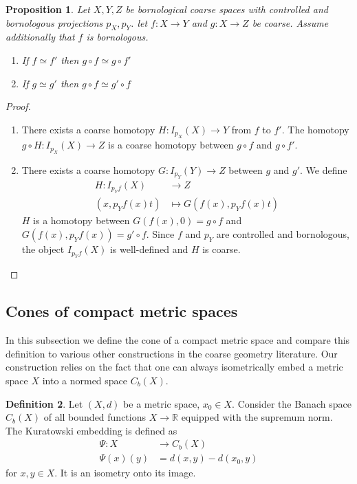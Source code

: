 \documentclass[a4paper,11pt]{article}
\theoremstyle{definition}
\newtheorem{definition}{Definition}[section]
\theoremstyle{plain}
\newtheorem{prop}[definition]{Proposition}
\theoremstyle{remark}
\begin{document}
\begin{prop} \label{properties} Let $X,Y,Z$ be bornological coarse spaces with controlled and bornologous projections $p_{X},p_{Y}$. let $f: X\rightarrow Y$ and $g: X\rightarrow Z$ be coarse. Assume additionally that $f$ is bornologous.
\begin{enumerate}
\item If $f\simeq f'$ then $g\circ f\simeq g\circ f'$
\item If $g\simeq g'$ then $g\circ f\simeq g'\circ f$
\end{enumerate}
\end{prop}

\begin{proof}
\begin{enumerate}
\item There exists a coarse homotopy $H: I_{p_{X}}(X)\rightarrow Y$ from $f$ to $f'$. The homotopy $g\circ H: I_{p_{X}}(X)\rightarrow Z$ is a coarse homotopy between $g\circ f$ and $g\circ f'$.
\item There exists a coarse homotopy $G: I_{p_{Y}}(Y)\rightarrow Z$ between $g$ and $g'$. We define
\begin{align*}
H: I_{p_{Y}f}(X)&\longrightarrow Z\\
(x,p_{Y}f(x)t) &\longmapsto G(f(x),p_{Y}f(x)t)
\end{align*}
$H$ is a homotopy between $G(f(x),0) = g\circ f$ and $G(f(x),p_{Y}f(x)) = g'\circ f$. Since $f$ and $p_{Y}$ are controlled and bornologous, the object $I_{p_{Y}f}(X)$ is well-defined and $H$ is coarse.
\end{enumerate}
\end{proof}





\subsection{Cones of compact metric spaces} 

In this subsection we define the cone of a compact metric space and compare this definition to various other constructions in the coarse geometry literature. Our construction relies on the fact that one can always isometrically embed a metric space $X$ into a normed space $C_{b}(X)$. 

\begin{definition} \label{Kuratowski} Let $(X,d)$ be a metric space, $x_0\in X$. Consider the Banach space $C_{b}(X)$ of all bounded functions $X\rightarrow \mathbb{R}$ equipped with the supremum norm. The Kuratowski embedding is defined as
\begin{align*}
\Psi: X&\rightarrow C_{b}(X)\\
\Psi(x)(y) &= d(x,y) - d(x_0,y)
\end{align*}
for $x,y\in X$. It is an isometry onto its image.
\end{definition}
\end{document}
